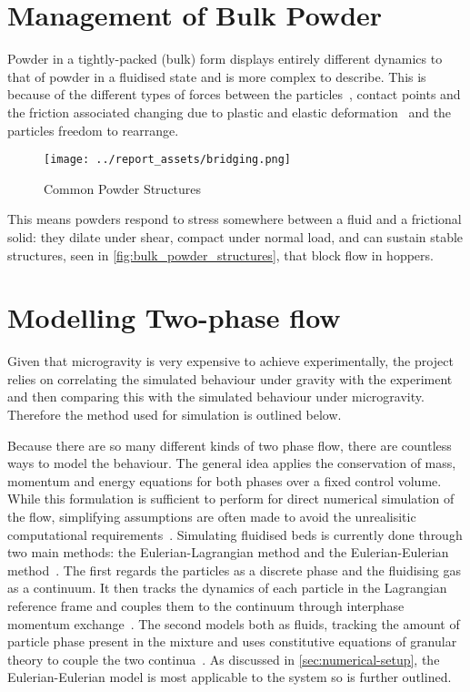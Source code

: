 \section{Management of Bulk Powder}\label{sec:bulk-powder}
Powder in a tightly-packed (bulk) form displays entirely different dynamics to that of powder in a fluidised state and is more complex to describe. This is because of the different types of forces between the particles~\cite{ZAFAR2017389}, contact points and the friction associated changing due to plastic and elastic deformation~\cite{TALEBI2024211} and the particles freedom to rearrange. 
\begin{figure}[htbp]
    \centering
    \begin{minipage}{0.5\textwidth}
        \centering
        \texttt{[image: ../report\_assets/bridging.png]}
        \caption{Common Powder Structures~\cite{911Metallurgist_binsflow}}\label{fig:bulk_powder_structures}
    \end{minipage}
\end{figure}
This means powders respond to stress somewhere between a fluid and a frictional solid: they dilate under shear, compact under normal load, and can sustain stable structures, seen in \autoref{fig:bulk_powder_structures}, that block flow in hoppers. 
\section{Modelling Two-phase flow}
Given that microgravity is very expensive to achieve experimentally, the project relies on correlating the simulated behaviour under gravity with the experiment and then comparing this with the simulated behaviour under microgravity. Therefore the method used for simulation is outlined below.

Because there are so many different kinds of two phase flow, there are countless ways to model the behaviour.  The general idea applies the conservation of mass, momentum and energy equations for both phases over a fixed control volume. While this formulation is sufficient to perform for direct numerical simulation of the flow, simplifying assumptions are often made to avoid the unrealisitic computational requirements~\cite{enwald1996eulerian}. Simulating fluidised beds is currently done through two main methods: the Eulerian-Lagrangian method and the Eulerian-Eulerian method~\cite{C6RA28615A}. The first regards the particles as a discrete phase and the fluidising gas as a continuum. It then tracks the dynamics of each particle in the Lagrangian reference frame and couples them to the continuum through interphase momentum exchange~\cite{SUBRAMANIAM2013215}. The second models both as fluids, tracking the amount of particle phase present in the mixture and uses constitutive equations of granular theory to couple the two continua~\cite{C6RA28615A}. As discussed in \autoref{sec:numerical-setup}, the Eulerian-Eulerian model is most applicable to the system so is further outlined.


